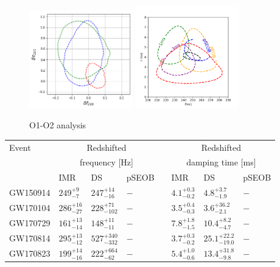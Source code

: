 \documentclass[twocolumn,prd,superscriptaddress,amsfonts,amssymb,amsmath,preprintnumbers]{revtex4-1}
\begin{document}
\begin{figure}
	\includegraphics[width=0.4\textwidth]{figures/O1O2_realevents.png}
	\includegraphics[width=0.4\textwidth]{figures/GW150914.png}
	\caption{O1-O2 analysis}\label{fig:o1o2_events}
\end{figure}

\begin{tabular}{llllllll}
\toprule
Event & \multicolumn{3}{c}{Redshifted} & \hphantom{X} & \multicolumn{3}{c}{Redshifted} \\
& \multicolumn{3}{c}{frequency [Hz]} & \hphantom{X} & \multicolumn{3}{c}{damping time [ms]} \\[0.075cm]
\cline{2-4}
\cline{6-8}
& IMR & DS & pSEOB & \hphantom{X} & IMR & DS & pSEOB \\
\midrule

GW150914 &
$249^{+9}_{-7}$ &
$247^{+14}_{-16}$ &
$-$ &
\hphantom{X} &
$4.1^{+0.3}_{-0.2}$ &
$4.8^{+3.7}_{-1.9}$ &
$-$
\\[0.075cm]

GW170104 &
$286^{+16}_{-27}$ &
$228^{+71}_{-102}$ &
$-$ &
\hphantom{X} &
$3.5^{+0.4}_{-0.3}$ &
$3.6^{+36.2}_{-2.1}$ &
$-$
\\[0.075cm]

GW170729 &
$161^{+13}_{-14}$ &
$148^{+11}_{-11}$ &
$-$ &
\hphantom{X} &
$7.8^{+1.8}_{-1.5}$ &
$10.4^{+8.2}_{-4.7}$ &
$-$
\\[0.075cm]

GW170814 &
$295^{+13}_{-12}$ &
$527^{+340}_{-332}$ &
$-$ &
\hphantom{X} &
$3.7^{+0.3}_{-0.2}$ &
$25.1^{+22.2}_{-19.0}$ &
$-$
\\[0.075cm]

GW170823 &
$199^{+14}_{-16}$ &
$222^{+664}_{-62}$ &
$-$ &
\hphantom{X} &
$5.4^{+1.0}_{-0.6}$ &
$13.4^{+31.8}_{-9.8}$ &
$-$
\\[0.075cm]

\bottomrule
\end{tabular}\label{tab:qnm_o1o2_results}
\end{document}

